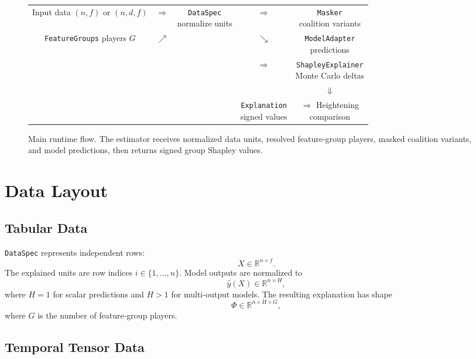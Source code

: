\documentclass[11pt]{article}
\newcommand{\code}[1]{\texttt{#1}}
\newcommand{\shape}[1]{\ensuremath{\left(#1\right)}}
\newcommand{\flowbox}[1]{\fbox{\begin{minipage}{0.22\linewidth}\centering #1\end{minipage}}}
\begin{document}
\begin{figure}[h]
\centering
\setlength{\tabcolsep}{4pt}
\begin{tabular}{ccccc}
\flowbox{Input data\\\(\shape{n,f}\) or \(\shape{n,d,f}\)}
& \(\Longrightarrow\) &
\flowbox{\code{DataSpec}\\normalize units}
& \(\Longrightarrow\) &
\flowbox{\code{Masker}\\coalition variants}
\\[6mm]
\flowbox{\code{FeatureGroups}\\players \(G\)}
& \(\nearrow\) & &
\(\searrow\) &
\flowbox{\code{ModelAdapter}\\predictions}
\\[6mm]
& & &
\(\Longrightarrow\) &
\flowbox{\code{ShapleyExplainer}\\Monte Carlo deltas}
\\[6mm]
& & & &
\(\Downarrow\)
\\[2mm]
& & &
\flowbox{\code{Explanation}\\signed values}
& \(\Longrightarrow\)
\flowbox{Heightening\\comparison}
\end{tabular}
\caption{Main runtime flow.  The estimator receives normalized data units,
resolved feature-group players, masked coalition variants, and model
predictions, then returns signed group Shapley values.}
\end{figure}

\section{Data Layout}

\subsection{Tabular Data}

\code{DataSpec} represents independent rows:
\[
X \in \mathbb{R}^{n \times f}.
\]
The explained units are row indices \(i \in \{1,\dots,n\}\).  Model outputs are
normalized to
\[
\hat{y}(X) \in \mathbb{R}^{n \times H},
\]
where \(H=1\) for scalar predictions and \(H>1\) for multi-output models.
The resulting explanation has shape
\[
\Phi \in \mathbb{R}^{n \times H \times G},
\]
where \(G\) is the number of feature-group players.

\subsection{Temporal Tensor Data}
\end{document}

